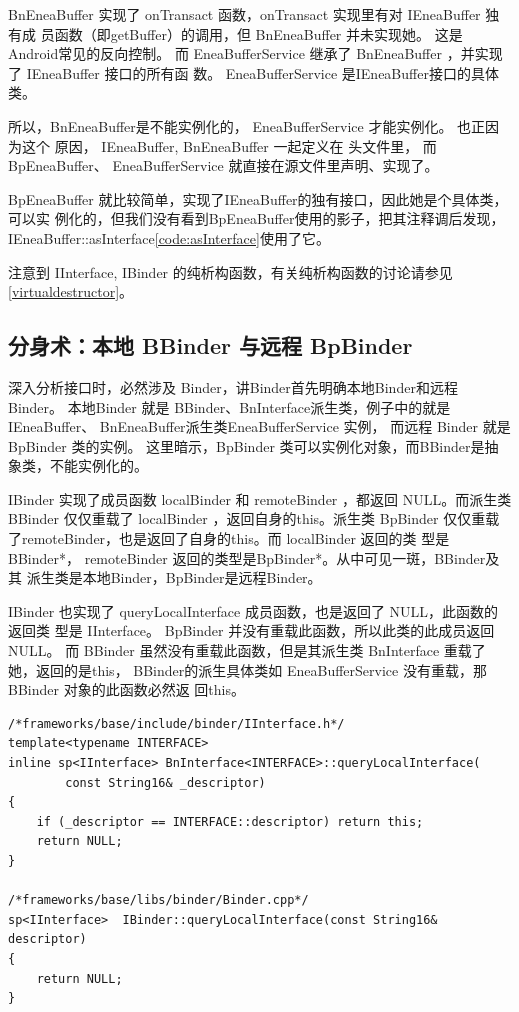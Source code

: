 \documentclass[a4paper,11pt]{article}
\begin{document}
BnEneaBuffer 实现了 onTransact 函数，onTransact 实现里有对 IEneaBuffer 独有成
员函数（即getBuffer）的调用，但 BnEneaBuffer 并未实现她。 这是Android常见的反向控制。
而 EneaBufferService 继承了 BnEneaBuffer ，并实现了 IEneaBuffer 接口的所有函
数。 EneaBufferService 是IEneaBuffer接口的具体类。

所以，BnEneaBuffer是不能实例化的， EneaBufferService 才能实例化。 也正因为这个
原因， IEneaBuffer, BnEneaBuffer 一起定义在 头文件里， 而 BpEneaBuffer、
EneaBufferService 就直接在源文件里声明、实现了。

BpEneaBuffer 就比较简单，实现了IEneaBuffer的独有接口，因此她是个具体类，可以实
例化的，但我们没有看到BpEneaBuffer使用的影子，把其注释调后发现，
IEneaBuffer::asInterface\autoref{code:asInterface}使用了它。

注意到 IInterface, IBinder 的纯析构函数，有关纯析构函数的讨论请参见
\autoref{virtualdestructor}。

\subsection{分身术：本地 BBinder 与远程 BpBinder}
深入分析接口时，必然涉及 Binder，讲Binder首先明确本地Binder和远程Binder。
本地Binder 就是 BBinder、BnInterface派生类，例子中的就是IEneaBuffer、
BnEneaBuffer派生类EneaBufferService 实例， 而远程 Binder 就是 BpBinder 类的实例。
这里暗示，BpBinder 类可以实例化对象，而BBinder是抽象类，不能实例化的。
\label{binder:LocalOrRemote}

IBinder\cite{BinderCpp} 实现了成员函数 localBinder 和 remoteBinder ，都返回
NULL。而派生类 BBinder 仅仅重载了 localBinder ，返回自身的this。派生类
BpBinder 仅仅重载了remoteBinder，也是返回了自身的this。而 localBinder 返回的类
型是 BBinder*，  remoteBinder 返回的类型是BpBinder*。从中可见一斑，BBinder及其
派生类是本地Binder，BpBinder是远程Binder。

IBinder 也实现了 queryLocalInterface 成员函数，也是返回了 NULL，此函数的返回类
型是 IInterface。 BpBinder 并没有重载此函数，所以此类的此成员返回NULL。 而
BBinder 虽然没有重载此函数，但是其派生类 BnInterface 重载了她，返回的是this，
BBinder的派生具体类如 EneaBufferService 没有重载，那BBinder 对象的此函数必然返
回this。
\begin{lstlisting}[caption=queryLocalInterface 的实现]
/*frameworks/base/include/binder/IInterface.h*/
template<typename INTERFACE>
inline sp<IInterface> BnInterface<INTERFACE>::queryLocalInterface(
        const String16& _descriptor)
{
    if (_descriptor == INTERFACE::descriptor) return this;
    return NULL;
}    

/*frameworks/base/libs/binder/Binder.cpp*/
sp<IInterface>  IBinder::queryLocalInterface(const String16& descriptor)
{
    return NULL;
} 
\end{lstlisting}
\end{document}
